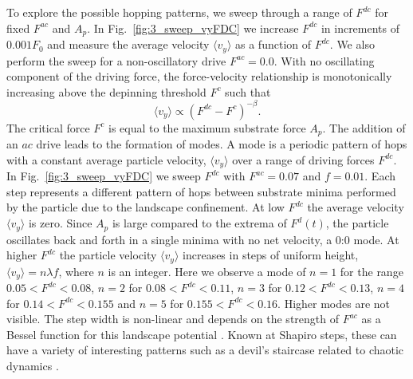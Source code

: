 \documentclass[twocolumn,showpacs,preprintnumbers,amsmath,amssymb,aps,prb]{revtex4}
\begin{document}
To explore the possible hopping patterns,
we sweep through a range of $F^{dc}$ for fixed $F^{ac}$ and $A_p$.
In Fig.~\ref{fig:3_sweep_vyFDC} 
we increase $F^{dc}$ in increments of $0.001 F_0$
and 
measure the average velocity $\langle v_y \rangle $ 
as a function of $F^{dc}$.
We also perform the sweep for a non-oscillatory drive $F^{ac} = 0.0$.
With no oscillating component of the driving force,
  the force-velocity relationship is monotonically increasing
  above the depinning threshold $F^c$ such that
  \begin{equation}
    \langle v_y \rangle \propto (F^{dc}-F^c)^{-\beta}.
  \end{equation}
  The critical force $F^c$ is equal to the maximum substrate force
  $A_p$. 
  The addition of an $ac$ drive leads
  to the formation of modes.
  A mode is a periodic pattern of hops
  with a constant average particle velocity, $\langle {v}_{y} \rangle$
  over a range of driving forces $F^{dc}$.
  In Fig.~\ref{fig:3_sweep_vyFDC}
  we sweep $F^{dc}$
  with $F^{ac} = 0.07$ and $f=0.01$.
Each step represents a different pattern of hops
between substrate minima
performed by the particle
due to the landscape confinement.  
At 
low $F^{dc}$ the average velocity $\langle v_y \rangle$ is zero.
Since 
$A_p$ is large compared to the extrema of $F^{d}(t)$,
the particle oscillates back and forth
in a single minima with no net velocity,
a 0:0 mode.
At higher $F^{dc}$ the particle velocity 
$\langle v_{y} \rangle$ increases in steps of uniform height,
$\langle v_{y} \rangle = n \lambda f$,
where $n$ is an integer.
Here we observe a mode of $n=1$
for the range $0.05 < F^{dc} < 0.08$,
$n=2$ for $0.08 < F^{dc} < 0.11$,
$n=3$ for $0.12 < F^{dc} < 0.13$,
$n=4$ for $0.14 < F^{dc} < 0.155$ and 
$n=5$ for $0.155 < F^{dc} < 0.16$.
Higher modes are not visible.
The step width is non-linear
and depends on the strength of $F^{ac}$
as a Bessel function 
for this landscape potential \cite{Reichhardt2000,Juniper2017}.
Known at Shapiro steps,
these can have a variety of
interesting patterns
such as a devil's staircase related to chaotic dynamics \cite{Bak1986}.
\end{document}
